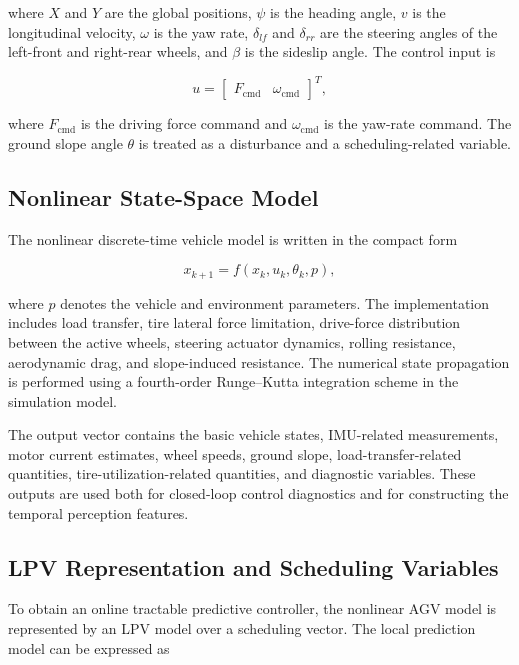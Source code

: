 \documentclass[twocolumn]{article}
\begin{document}
where $X$ and $Y$ are the global positions, $\psi$ is the heading angle, $v$ is the longitudinal velocity, $\omega$ is the yaw rate, $\delta_{lf}$ and $\delta_{rr}$ are the steering angles of the left-front and right-rear wheels, and $\beta$ is the sideslip angle. The control input is

\begin{equation}
u =
\begin{bmatrix}
F_{\mathrm{cmd}} & \omega_{\mathrm{cmd}}
\end{bmatrix}^{T},
\label{eq:input_vector}
\end{equation}

where $F_{\mathrm{cmd}}$ is the driving force command and $\omega_{\mathrm{cmd}}$ is the yaw-rate command. The ground slope angle $\theta$ is treated as a disturbance and a scheduling-related variable.

\subsection{Nonlinear State-Space Model}

The nonlinear discrete-time vehicle model is written in the compact form

\begin{equation}
x_{k+1} = f(x_k,u_k,\theta_k,p),
\label{eq:nonlinear_model}
\end{equation}

where $p$ denotes the vehicle and environment parameters. The implementation includes load transfer, tire lateral force limitation, drive-force distribution between the active wheels, steering actuator dynamics, rolling resistance, aerodynamic drag, and slope-induced resistance. The numerical state propagation is performed using a fourth-order Runge--Kutta integration scheme in the simulation model.

The output vector contains the basic vehicle states, IMU-related measurements, motor current estimates, wheel speeds, ground slope, load-transfer-related quantities, tire-utilization-related quantities, and diagnostic variables. These outputs are used both for closed-loop control diagnostics and for constructing the temporal perception features.

\subsection{LPV Representation and Scheduling Variables}

To obtain an online tractable predictive controller, the nonlinear AGV model is represented by an LPV model over a scheduling vector. The local prediction model can be expressed as
\end{document}
